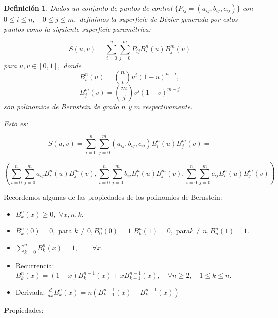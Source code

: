 \documentclass[ebook,oneside]{memoir}
\newtheorem{defn}[thm]{Definición}
\begin{document}
\begin{defn}
Dados un conjunto de puntos de control
$\{P_{ij}=(a_{ij},b_{ij},c_{ij})\}$ con $0\leq i\leq n,\quad 0\leq j\leq m,$ definimos la superficie de B\'{e}zier generada por estos puntos como la siguiente superficie param\'{e}trica:

$$S(u,v)=\sum_{i=0}^n \sum_{j=0}^m P_{ij} B_i^n(u) B_j^m(v)$$
para $u,v\in [0,1],$ \quad donde $$B_i^n(u)=\binom{n}{i} u^i(1-u)^{n-i},$$
$$B_j^m(v)=\binom{m}{j} v^j (1-v)^{m-j}$$
son polinomios de Bernstein de grado $n$ y $m$ respectivamente.

Esto es:

$$S(u,v)=\sum_{i=0}^n \sum_{j=0}^m (a_{ij},b_{ij},c_{ij}) B_i^n(u)B_j^m(v)=$$

$$\left( \sum_{i=0}^n \sum_{j=0}^m a_{ij} B_i^n(u) B_j^m(v),\sum_{i=0}^n \sum_{j=0}^m b_{ij} B_i^n(u) B_j^m(v), \sum_{i=0}^n \sum_{j=0}^m c_{ij} B_i^n(u) B_j^m(v) \right)$$
\end{defn}

%
%
%
%
Recordemos algunas de las propiedades de los polinomios de Bernstein:

\begin{itemize}
    \item $B_k^n(x)\geq 0,$ \quad  \quad $\forall x,n,k.$
    \vspace{0.2cm}
    \item $B_k^n(0)=0,$ para \quad$ k\neq 0,$\quad  $B_0^n(0)=1$ $B_k^n(1)=0,$ para\quad$ k\neq n,$\quad  $B_n^n(1)=1.$
    \vspace{0.2cm}
    \item $\sum_{k=0}^{n}B_k^n(x)=1, \quad\quad \forall x.$
    \vspace{0.2cm}
    \item Recurrencia: $B_k^n(x)=(1-x)B_k^{n-1}(x)+xB_{k-1}^{n-1}(x), \quad \forall n\geq 2, \quad 1\leq k\leq n.$
    \vspace{0.2cm}
    \item Derivada: $\displaystyle \frac{d}{dx} B_k^n(x)= n( B_{k-1}^{n-1}(x)-B_k^{n-1}(x))$
\end{itemize}

{\textbf Propiedades:}
\end{document}
